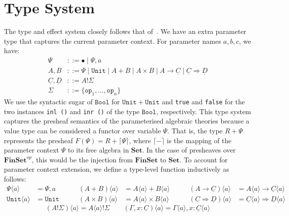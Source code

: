 \documentclass{scrartcl}
\theoremstyle{definition}
\newcommand{\Set}{\mathbf{Set}}
\newcommand{\Fin}{\mathbf{FinSet}}
\newcommand{\op}{\mathtt{op}}
\newcommand{\Unit}{\mathtt{Unit}}
\newcommand{\Bool}{\mathtt{Bool}}
\newcommand{\PCtx}{\Psi}
\newcommand{\cC}{\underline{C}}
\newcommand{\cD}{\underline{D}}
\begin{document}

\section{Type System}

The type and effect system closely follows that of~\cite{pretnar_introduction_2015}. We have an extra parameter type that captures the current parameter context. For parameter names $a,b,c$, we have:
\begin{align*}
    \PCtx &::= \bullet \mid \PCtx,a \\
    A, B &::= \PCtx \mid \Unit \mid A + B \mid A \times B \mid A \to \cC \mid \cC \Rightarrow \cD \\
    \cC, \cD &::= A!\Sigma \\
    \Sigma &::= \{\op_1,\dots,\op_n\}
\end{align*}
We use the syntactic sugar of $\Bool$ for $\Unit + \Unit$ and \lstinline{true} and \lstinline{false} for the two instances \lstinline{inl ()} and \lstinline{inr ()} of the type $\Bool$, respectively. This type system captures the presheaf semantics of the parameterised algebraic theories because a value type can be considered a functor over variable $\PCtx$. That is, the type $R + \PCtx$ represents the presheaf $F(\PCtx) = R + \lceil \PCtx\rceil$, where $\lceil{-}\rceil$ is the mapping of the parameter context $\PCtx$ to its free algebra in $\Set$. In the case of presheaves over $\Fin^{op}$, this would be the injection from $\Fin$ to $\Set$. To account for parameter context extension, we define a type-level function inductively as follows:
\begin{equation*}
    \begin{split}
        \PCtx\langle a \rangle &= \PCtx,a \\
        \Unit\langle a \rangle &= \Unit 
    \end{split}
    \qquad
    \begin{split}
        (A+B)\langle a \rangle &= A\langle a \rangle + B\langle a \rangle \\
        (A\times B)\langle a \rangle &= A\langle a \rangle \times B\langle a \rangle
    \end{split}
    \qquad
    \begin{split}
        (A\to \cC)\langle a \rangle &= A\langle a \rangle \to \cC\langle a \rangle \\
        (\cC \Rightarrow \cD)\langle a \rangle &= \cC\langle a \rangle \Rightarrow \cD\langle a \rangle
    \end{split}
\end{equation*}
\begin{equation*}
    (A!\Sigma) \langle a \rangle = A\langle a \rangle!\Sigma \qquad (\Gamma, x:\cC)\langle a \rangle = \Gamma\langle a \rangle, x: \cC \langle a \rangle
\end{equation*}
\end{document}
